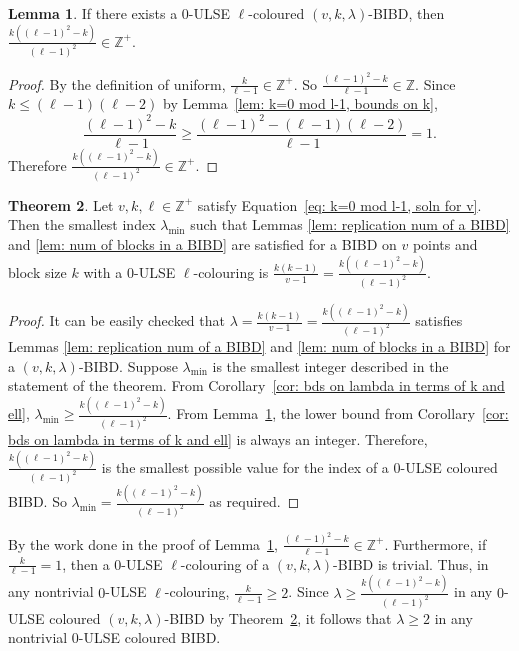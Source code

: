 \documentclass[12pt]{article}
\theoremstyle{definition}
\newtheorem{theorem}{Theorem}[section]
\newtheorem{lemma}[theorem]{Lemma}
\begin{document}
\begin{lemma}\label{lem: lower bd on lambda is always an int}
    If there exists a $0$-ULSE $\ell$-coloured $(v,k,\lambda)$-BIBD, then $\frac{k((\ell-1)^2 - k)}{(\ell-1)^2} \in \mathbb{Z}^+$.
\end{lemma}

\begin{proof}
    By the definition of uniform, $\frac{k}{\ell-1}\in \mathbb{Z}^+$. So $\frac{(\ell-1)^2 - k}{\ell-1}\in \mathbb{Z}$. Since $k\leq (\ell-1)(\ell-2)$ by Lemma~\ref{lem: k=0 mod l-1, bounds on k}, \[\frac{(\ell-1)^2 - k}{\ell-1} \geq \frac{(\ell-1)^2 - (\ell-1)(\ell-2)}{\ell-1} = 1.\] Therefore $\frac{k((\ell-1)^2 - k)}{(\ell-1)^2} \in \mathbb{Z}^+$.
\end{proof}

\begin{theorem}\label{thm: smallest lambda in 0-ULSE colouring}
    Let $v, k, \ell\in \mathbb{Z}^+$ satisfy Equation~\eqref{eq: k=0 mod l-1, soln for v}. Then the smallest index $\lambda_{\min}$ such that Lemmas \ref{lem: replication num of a BIBD} and \ref{lem: num of blocks in a BIBD} are satisfied for a BIBD on $v$ points and block size $k$ with a $0$-ULSE $\ell$-colouring is $\frac{k(k-1)}{v-1} = \frac{k((\ell-1)^2 - k)}{(\ell-1)^2}$. 
\end{theorem}

\begin{proof}
    It can be easily checked that $\lambda = \frac{k(k-1)}{v-1} = \frac{k((\ell-1)^2 - k)}{(\ell-1)^2}$ satisfies Lemmas \ref{lem: replication num of a BIBD} and \ref{lem: num of blocks in a BIBD} for a $(v,k,\lambda)$-BIBD. Suppose $\lambda_{\min}$ is the smallest integer described in the statement of the theorem. From Corollary~\ref{cor: bds on lambda in terms of k and ell}, $\lambda_{\min} \geq \frac{k((\ell-1)^2 - k)}{(\ell-1)^2}$. From Lemma~\ref{lem: lower bd on lambda is always an int}, the lower bound from Corollary~\ref{cor: bds on lambda in terms of k and ell} is always an integer. Therefore, $\frac{k((\ell-1)^2 - k)}{(\ell-1)^2}$ is the smallest possible value for the index of a $0$-ULSE coloured BIBD. So $\lambda_{\min} = \frac{k((\ell-1)^2 - k)}{(\ell-1)^2}$ as required.
\end{proof}

By the work done in the proof of Lemma~\ref{lem: lower bd on lambda is always an int}, $\frac{(\ell-1)^2 - k}{\ell-1} \in \mathbb{Z}^+$. Furthermore, if $\frac{k}{\ell - 1} = 1$, then a $0$-ULSE $\ell$-colouring of a $(v,k,\lambda)$-BIBD is trivial. Thus, in any nontrivial $0$-ULSE $\ell$-colouring, $\frac{k}{\ell - 1} \geq 2$. Since $\lambda \geq \frac{k((\ell-1)^2 - k)}{(\ell-1)^2}$ in any $0$-ULSE coloured $(v,k,\lambda)$-BIBD by Theorem~\ref{thm: smallest lambda in 0-ULSE colouring}, it follows that $\lambda \geq 2$ in any nontrivial $0$-ULSE coloured BIBD. 
\end{document}
